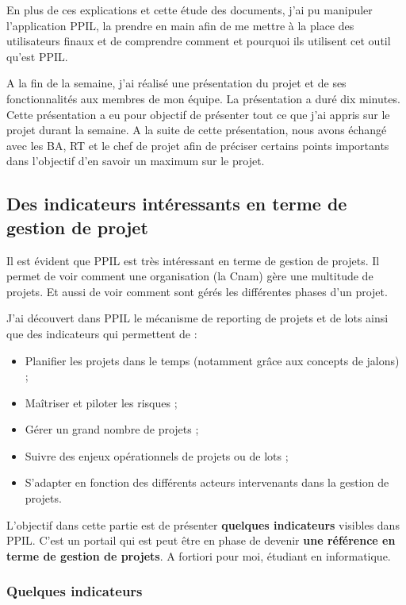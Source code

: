 En plus de ces explications et cette étude des documents, j'ai pu manipuler l'application PPIL, la prendre en main afin de me mettre à la place des utilisateurs finaux et de comprendre comment et pourquoi ils utilisent cet outil qu'est PPIL.

A la fin de la semaine, j'ai réalisé une présentation du projet et de ses fonctionnalités aux membres de mon équipe. La présentation a duré dix minutes. Cette présentation a eu pour objectif de présenter tout ce que j'ai appris sur le projet durant la semaine. A la suite de cette présentation, nous avons échangé avec les BA, RT et le chef de projet afin de préciser certains points importants dans l'objectif d'en savoir un maximum sur le projet.

\subsection{Des indicateurs intéressants en terme de gestion de projet}

Il est évident que PPIL est très intéressant en terme de gestion de projets. Il permet de voir comment une organisation (la Cnam) gère une multitude de projets. Et aussi de voir comment sont gérés les différentes phases d'un projet.

J'ai découvert dans PPIL le mécanisme de reporting de projets et de lots ainsi que des indicateurs qui permettent de :
\begin{itemize}
    \item Planifier les projets dans le temps (notamment grâce aux concepts de jalons) ;
    \item Maîtriser et piloter les risques ;
    \item Gérer un grand nombre de projets ;
    \item Suivre des enjeux opérationnels de projets ou de lots ;
    \item S'adapter en fonction des différents acteurs intervenants dans la gestion de projets.
\end{itemize}
L'objectif dans cette partie est de présenter \textbf{quelques indicateurs} visibles dans PPIL. C'est un portail qui est peut être en phase de devenir \textbf{une référence en terme de gestion de projets}. A fortiori pour moi, étudiant en informatique. 

\subsubsection{Quelques indicateurs}

